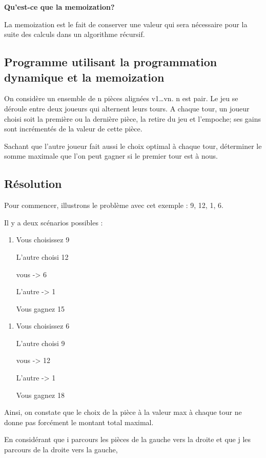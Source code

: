 \documentclass[a4paper]{article}
\begin{document}
\textbf{Qu'est-ce que la memoization?}

La memoization est le fait de conserver une valeur qui sera nécessaire pour la suite des calculs dans un algorithme récursif.

\subsection{Programme utilisant la programmation dynamique et la memoization}
\label{sec:org4233bc1}

On considère un ensemble de n pièces alignées v1\ldots{}vn. n est pair. Le jeu se déroule entre deux joueurs qui alternent leurs tours. A chaque tour, un joueur choisi soit la première ou la dernière pièce, la retire du jeu et l'empoche; ses gains sont incrémentés de la valeur de cette pièce.

Sachant que l'autre joueur fait aussi le choix optimal à chaque tour, déterminer le somme maximale que l'on peut gagner si le premier tour est à nous.


\subsection{Résolution}
\label{sec:org4cd27d4}

Pour commencer, illustrons le problème avec cet exemple :
9, 12, 1, 6.

Il y a deux scénarios possibles :

\begin{enumerate}
\item Vous choisissez 9

L'autre choisi 12

vous -> 6

L'autre -> 1

Vous gagnez 15
\end{enumerate}


\begin{enumerate}
\item Vous choisissez 6

L'autre choisi 9

vous -> 12

L'autre -> 1

Vous gagnez 18
\end{enumerate}


Ainsi, on constate que le choix de la pièce à la valeur max à chaque tour ne donne pas forcément le montant total maximal.

En considérant que i parcours les pièces de la gauche vers la droite et que j les parcours de la droite vers la gauche,
\end{document}
